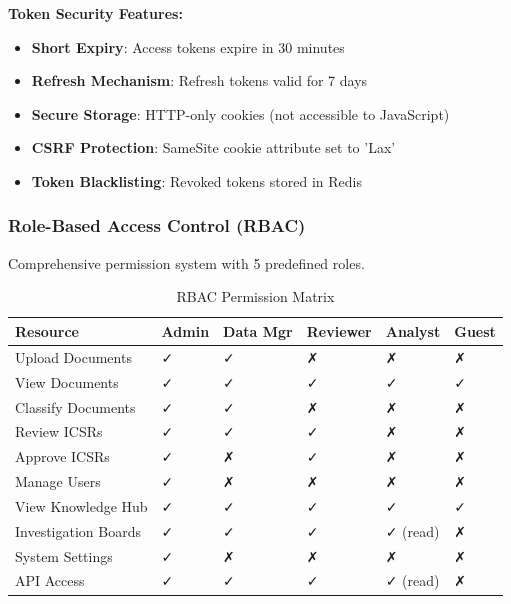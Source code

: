 \textbf{Token Security Features:}
\begin{itemize}
    \item \textbf{Short Expiry}: Access tokens expire in 30 minutes
    \item \textbf{Refresh Mechanism}: Refresh tokens valid for 7 days
    \item \textbf{Secure Storage}: HTTP-only cookies (not accessible to JavaScript)
    \item \textbf{CSRF Protection}: SameSite cookie attribute set to 'Lax'
    \item \textbf{Token Blacklisting}: Revoked tokens stored in Redis
\end{itemize}

\subsubsection{Role-Based Access Control (RBAC)}

Comprehensive permission system with 5 predefined roles.

\begin{table}[h]
\centering
\caption{RBAC Permission Matrix}
\begin{tabularx}{\textwidth}{lXXXXX}
\toprule
\textbf{Resource} & \textbf{Admin} & \textbf{Data Mgr} & \textbf{Reviewer} & \textbf{Analyst} & \textbf{Guest} \\
\midrule
Upload Documents & ✓ & ✓ & ✗ & ✗ & ✗ \\
View Documents & ✓ & ✓ & ✓ & ✓ & ✓ \\
Classify Documents & ✓ & ✓ & ✗ & ✗ & ✗ \\
Review ICSRs & ✓ & ✓ & ✓ & ✗ & ✗ \\
Approve ICSRs & ✓ & ✗ & ✓ & ✗ & ✗ \\
Manage Users & ✓ & ✗ & ✗ & ✗ & ✗ \\
View Knowledge Hub & ✓ & ✓ & ✓ & ✓ & ✓ \\
Investigation Boards & ✓ & ✓ & ✓ & ✓ (read) & ✗ \\
System Settings & ✓ & ✗ & ✗ & ✗ & ✗ \\
API Access & ✓ & ✓ & ✓ & ✓ (read) & ✗ \\
\bottomrule
\end{tabularx}
\end{table}


